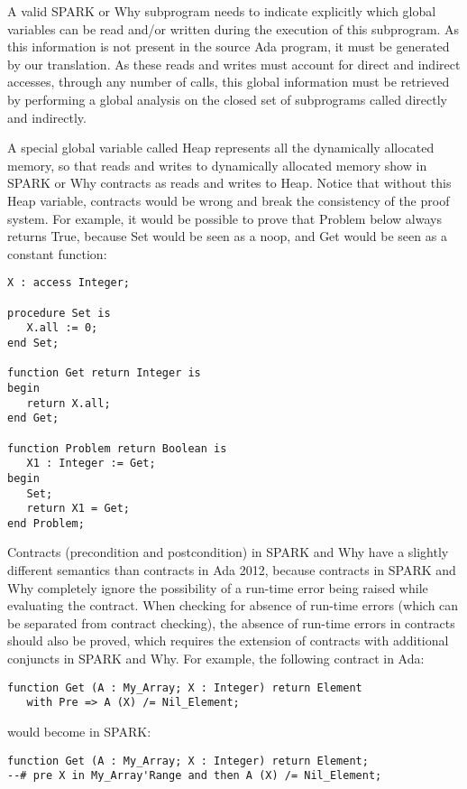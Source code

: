 \documentclass{article}
\begin{document}
A valid SPARK or Why subprogram needs to indicate explicitly which global
variables can be read and/or written during the execution of this
subprogram. As this information is not present in the source Ada program, it
must be generated by our translation. As these reads and writes must account
for direct and indirect accesses, through any number of calls, this global
information must be retrieved by performing a global analysis on the closed set
of subprograms called directly and indirectly.

A special global variable called Heap represents all the dynamically allocated
memory, so that reads and writes to dynamically allocated memory show in SPARK
or Why contracts as reads and writes to Heap. Notice that without this Heap
variable, contracts would be wrong and break the consistency of the proof
system. For example, it would be possible to prove that Problem below always
returns True, because Set would be seen as a noop, and Get would be seen as a
constant function:

\begin{verbatim}
X : access Integer;

procedure Set is
   X.all := 0;
end Set;

function Get return Integer is
begin
   return X.all;
end Get;

function Problem return Boolean is
   X1 : Integer := Get;
begin
   Set;
   return X1 = Get;
end Problem;
\end{verbatim}

Contracts (precondition and postcondition) in SPARK and Why have a
slightly different semantics than contracts in Ada 2012, because contracts in
SPARK and Why completely ignore the possibility of a run-time error being
raised while evaluating the contract. When checking for absence of run-time
errors (which can be separated from contract checking), the absence of run-time
errors in contracts should also be proved, which requires the extension of
contracts with additional conjuncts in SPARK and Why. For example, the
following contract in Ada:

\begin{verbatim}
function Get (A : My_Array; X : Integer) return Element
   with Pre => A (X) /= Nil_Element;
\end{verbatim}

would become in SPARK:

\begin{verbatim}
function Get (A : My_Array; X : Integer) return Element;
--# pre X in My_Array'Range and then A (X) /= Nil_Element;
\end{verbatim}
\end{document}
